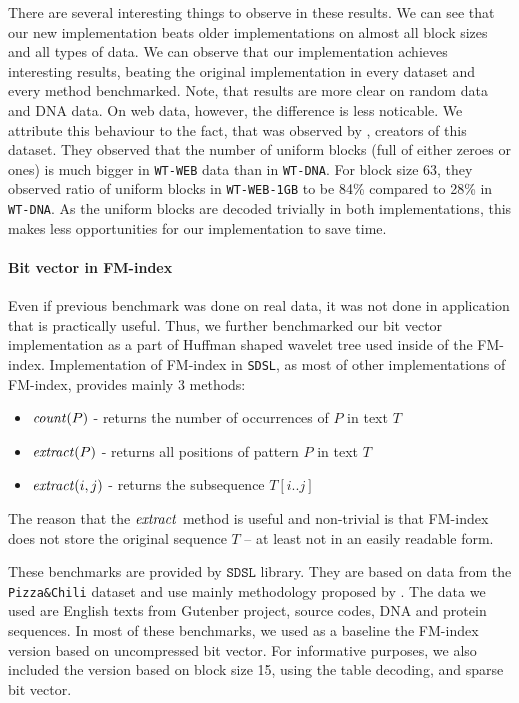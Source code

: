 There are several interesting things to observe in these results. We can see that our new implementation
beats older implementations on almost all block sizes and all types of data. We can observe that our
implementation achieves interesting results, beating the original implementation in every dataset and
every method benchmarked. Note, that results are more clear on random data and DNA data. On web data,
however, the difference is less noticable. We attribute this behaviour to the fact, that was observed by
\cite{gog2014optimized}, creators of this dataset. They observed that the number of uniform blocks
(full of either zeroes or ones) is much bigger in \texttt{WT-WEB} data than in \texttt{WT-DNA}. For
block size 63, they observed ratio of uniform blocks in \texttt{WT-WEB-1GB} to be 84\% compared to
28\% in \texttt{WT-DNA}. As the uniform blocks are decoded trivially in both implementations, this makes
less opportunities for our implementation to save time.

\paragraph{Bit vector in FM-index}

Even if previous benchmark was done on real data, it was not done in application that is
practically useful. Thus, we further benchmarked our bit vector implementation as a part
of Huffman shaped wavelet tree used inside of the FM-index. Implementation of FM-index in
\texttt{SDSL}, as most of other implementations of FM-index, provides mainly 3 methods:
\begin{itemize}
	\item $\mathit{count}(P)$ - returns the number of occurrences of $P$ in text $T$
	\item $\mathit{extract}(P)$ - returns all positions of pattern $P$ in text $T$
	\item $\mathit{extract}(i, j)$ - returns the subsequence $T[i..j]$
\end{itemize}
The reason that the $\mathit{extract}$ method is useful and non-trivial is that FM-index
does not store the original sequence $T$ -- at least not in an easily readable form.

These benchmarks are provided by $\texttt{SDSL}$ library. They are based on data from
the \texttt{Pizza\&Chili} dataset and use mainly methodology proposed by \cite{ferragina2009compressed}.
The data we used are English texts from Gutenber project, source codes, DNA and protein
sequences. In most of these benchmarks, we used as a baseline the FM-index version based
on uncompressed bit vector. For informative purposes, we also included the version based
on block size 15, using the table decoding, and sparse bit vector.

